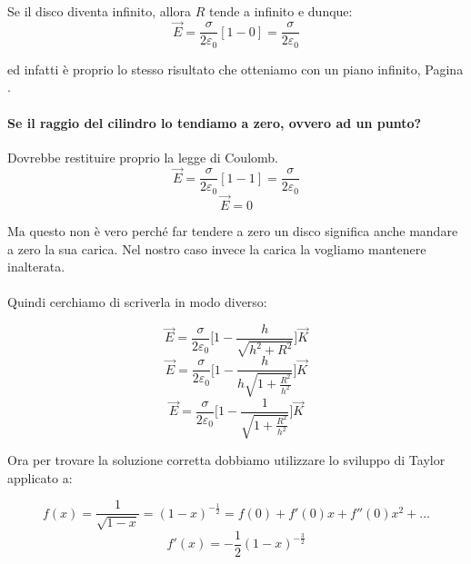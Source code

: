 Se il disco diventa infinito, allora $R$ tende a infinito e dunque:
\begin{equation}
    \vec{E} = \frac{\sigma}{2\varepsilon_0} [ 1 - 0] = \frac{\sigma}{2\varepsilon_0}
\end{equation}

ed infatti è proprio lo stesso risultato che otteniamo con un piano infinito, Pagina \pageref{pianoInfinito}.

\paragraph{Se il raggio del cilindro lo tendiamo a zero, ovvero ad un punto?} 
Dovrebbe restituire proprio la legge di Coulomb.
\begin{equation*}
    \vec{E} = \frac{\sigma}{2\varepsilon_0} [ 1 - 1] = \frac{\sigma}{2\varepsilon_0}
\end{equation*}
\begin{equation}
    \vec{E} = 0
\end{equation}

Ma questo non è vero perché far tendere a zero un disco significa anche mandare a zero la sua carica. Nel nostro caso invece la carica la vogliamo mantenere inalterata.
\paragraph{}
Quindi cerchiamo di scriverla in modo diverso:

\begin{equation*}
   \vec{E} = \frac{\sigma}{2\varepsilon_0} \bigg[ 1 - \frac{h}{\sqrt{h^2 + R^2}}\bigg]\vec{K}
\end{equation*}
\begin{equation*}
    \vec{E} = \frac{\sigma}{2\varepsilon_0} \Biggl[ 1 - \frac{h}{h\sqrt{1 + \frac{R^2}{h^2} }}\Biggl]\vec{K}
\end{equation*}
\begin{equation*}
    \vec{E} = \frac{\sigma}{2\varepsilon_0} \Biggl[ 1 - \frac{1}{\sqrt{1 + \frac{R^2}{h^2} }}\Biggl]\vec{K}
\end{equation*}

Ora per trovare la soluzione corretta dobbiamo utilizzare lo sviluppo di Taylor applicato a: 

\begin{equation*}
    f(x) = \frac{1}{\sqrt{1 - x}} = (1-x)^{-\frac{1}{2}} = f(0) + f'(0)x + f''(0)x^2 + \dots
\end{equation*}
\begin{equation*}
    f'(x) = -\frac{1}{2}(1-x)^{-\frac{3}{2}}
\end{equation*}

